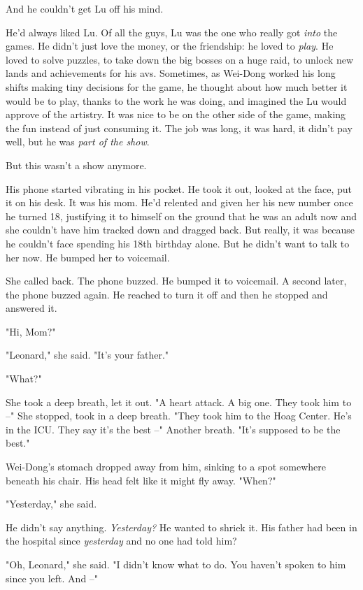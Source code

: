 And he couldn't get Lu off his mind.

He'd always liked Lu. Of all the guys, Lu was the one who really
got \emph{into} the games. He didn't just love the money, or the
friendship: he loved to \emph{play}. He loved to solve puzzles, to
take down the big bosses on a huge raid, to unlock new lands and
achievements for his avs. Sometimes, as Wei-Dong worked his long
shifts making tiny decisions for the game, he thought about how
much better it would be to play, thanks to the work he was doing,
and imagined the Lu would approve of the artistry. It was nice to
be on the other side of the game, making the fun instead of just
consuming it. The job was long, it was hard, it didn't pay well,
but he was \emph{part of the show}.

But this wasn't a show anymore.

His phone started vibrating in his pocket. He took it out, looked
at the face, put it on his desk. It was his mom. He'd relented and
given her his new number once he turned 18, justifying it to
himself on the ground that he was an adult now and she couldn't
have him tracked down and dragged back. But really, it was because
he couldn't face spending his 18th birthday alone. But he didn't
want to talk to her now. He bumped her to voicemail.

She called back. The phone buzzed. He bumped it to voicemail. A
second later, the phone buzzed again. He reached to turn it off and
then he stopped and answered it.

"Hi, Mom?"

"Leonard," she said. "It's your father."

"What?"

She took a deep breath, let it out. "A heart attack. A big one.
They took him to --" She stopped, took in a deep breath. "They took
him to the Hoag Center. He's in the ICU. They say it's the best --"
Another breath. "It's supposed to be the best."

Wei-Dong's stomach dropped away from him, sinking to a spot
somewhere beneath his chair. His head felt like it might fly away.
"When?"

"Yesterday," she said.

He didn't say anything. \emph{Yesterday?} He wanted to shriek it.
His father had been in the hospital since \emph{yesterday} and no
one had told him?

"Oh, Leonard," she said. "I didn't know what to do. You haven't
spoken to him since you left. And --"

